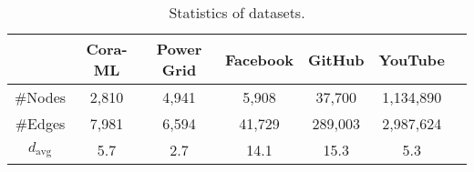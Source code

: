 \begin{table}[!tb]
\centering
\caption{Statistics of datasets.}
\resizebox{\columnwidth}{!} {
\begin{tabular}{ccccccc}
\toprule
    & Cora-ML 
    & Power Grid 
    & Facebook 
    & GitHub 
    & YouTube
    \\
\midrule
\#Nodes  
& 2,810   
& 4,941    
& 5,908    
& 37,700    
& 1,134,890  
\\
\#Edges  
& 7,981    
& 6,594    
& 41,729   
& 289,003   
& 2,987,624  
\\
$d_{\text{avg}}$ 
& 5.7     
& 2.7      
& 14.1     
& 15.3      
& 5.3        
\\
\bottomrule
\end{tabular} }
\label{table:datasets}
\end{table}
